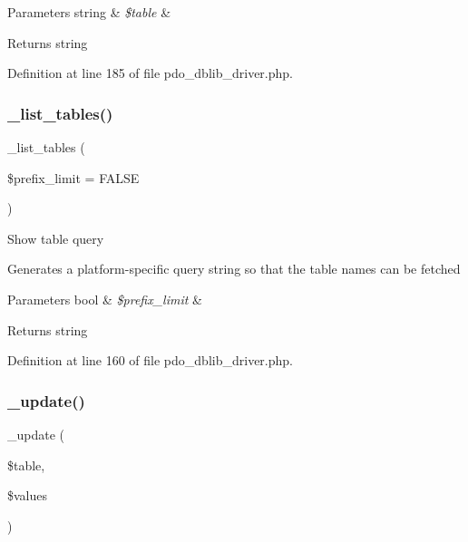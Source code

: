 \begin{DoxyParams}[1]{Parameters}
string & {\em \$table} & \\
\hline
\end{DoxyParams}
\begin{DoxyReturn}{Returns}
string 
\end{DoxyReturn}


Definition at line 185 of file pdo\+\_\+dblib\+\_\+driver.\+php.

\mbox{\label{class_c_i___d_b__pdo__dblib__driver_a435c0f3ce54fe7daa178baa8532ebd54}} 
\subsubsection{\texorpdfstring{\_list\_tables()}{\_list\_tables()}}
{\footnotesize\ttfamily \+\_\+list\+\_\+tables (\begin{DoxyParamCaption}\item[{}]{\$prefix\+\_\+limit = {\ttfamily FALSE} }\end{DoxyParamCaption})\hspace{0.3cm}{\ttfamily [protected]}}

Show table query

Generates a platform-\/specific query string so that the table names can be fetched


\begin{DoxyParams}[1]{Parameters}
bool & {\em \$prefix\+\_\+limit} & \\
\hline
\end{DoxyParams}
\begin{DoxyReturn}{Returns}
string 
\end{DoxyReturn}


Definition at line 160 of file pdo\+\_\+dblib\+\_\+driver.\+php.

\mbox{\label{class_c_i___d_b__pdo__dblib__driver_a2540b03a93fa73ae74c10d0e16fc073e}} 
\subsubsection{\texorpdfstring{\_update()}{\_update()}}
{\footnotesize\ttfamily \+\_\+update (\begin{DoxyParamCaption}\item[{}]{\$table,  }\item[{}]{\$values }\end{DoxyParamCaption})\hspace{0.3cm}{\ttfamily [protected]}}

